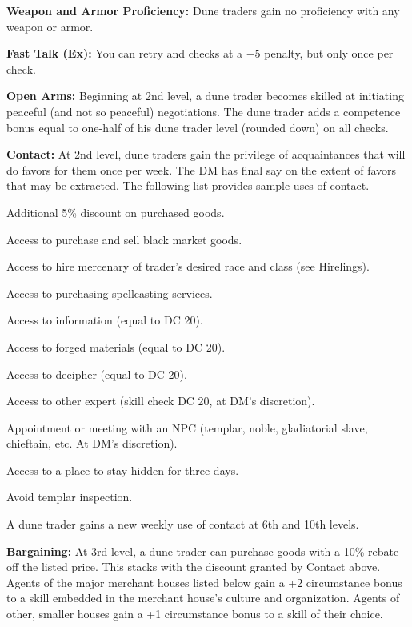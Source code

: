 {
\textbf{Weapon and Armor Proficiency:} Dune traders gain no proficiency with any weapon or armor.

\textbf{Fast Talk (Ex):} You can retry  and  checks at a $-5$ penalty, but only once per check.

\textbf{Open Arms:} Beginning at 2nd level, a dune trader becomes skilled at initiating peaceful (and not so peaceful) negotiations. The dune trader adds a competence bonus equal to one-half of his dune trader level (rounded down) on all  checks.

\textbf{Contact:} At 2nd level, dune traders gain the privilege of acquaintances that will do favors for them once per week. The DM has final say on the extent of favors that may be extracted. The following list provides sample uses of contact.

\begin{itemize*}
\item Additional 5\% discount on purchased goods.
\item Access to purchase and sell black market goods.
\item Access to hire mercenary of trader's desired race and class (see Hirelings).
\item Access to purchasing spellcasting services.
\item Access to information (equal to  DC 20).
\item Access to forged materials (equal to  DC 20).
\item Access to decipher (equal to  DC 20).
\item Access to other expert (skill check DC 20, at DM's discretion).
\item Appointment or meeting with an NPC (templar, noble, gladiatorial slave, chieftain, etc. At DM's discretion).
\item Access to a place to stay hidden for three days.
\item Avoid templar inspection.
\end{itemize*}

A dune trader gains a new weekly use of contact at 6th and 10th levels.

\textbf{Bargaining:} At 3rd level, a dune trader can purchase goods with a 10\% rebate off the listed price. This stacks with the discount granted by Contact above. Agents of the major merchant houses listed below gain a +2 circumstance bonus to a skill embedded in the merchant house's culture and organization. Agents of other, smaller houses gain a +1 circumstance bonus to a skill of their choice.

}
